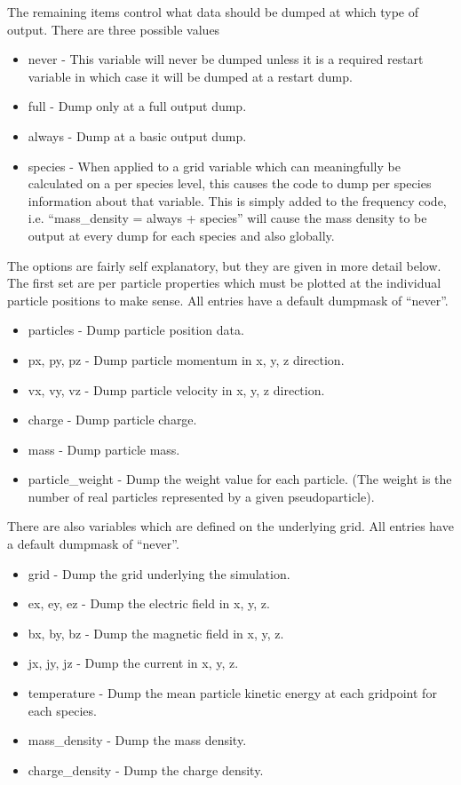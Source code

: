 The remaining items control what data should be dumped at which type of
output. There are three possible values\\
\begin{itemize}
\item never - This variable will never be dumped unless it is a required restart
  variable in which case it will be dumped at a restart dump.
\item full - Dump only at a full output dump.
\item always - Dump at a basic output dump.
\item species - When applied to a grid variable which can meaningfully be
  calculated on a per species level, this causes the code to dump per species
  information about that variable. This is simply added to the frequency code,
  i.e. ``mass\_density = always + species'' will cause the mass density to be
  output at every dump for each species and also globally.
\end{itemize}

The options are fairly self explanatory, but they are given in more detail
below. The first set are per particle properties which must be plotted at the
individual particle positions to make sense. All entries have a default
dumpmask of ``never''.\\
\begin{itemize}
\item particles - Dump particle position data.
\item px, py, pz - Dump particle momentum in x, y, z direction.
\item vx, vy, vz - Dump particle velocity in x, y, z direction.
\item charge - Dump particle charge.
\item mass - Dump particle mass.
\item particle\_weight - Dump the weight value for each particle. (The weight
  is the number of real particles represented by a given pseudoparticle).
\end{itemize}

There are also variables which are defined on the underlying grid. All entries
have a default dumpmask of ``never''.\\
\begin{itemize}
\item grid - Dump the grid underlying the simulation.
\item ex, ey, ez - Dump the electric field in x, y, z.
\item bx, by, bz - Dump the magnetic field in x, y, z.
\item jx, jy, jz - Dump the current in x, y, z.
\item temperature - Dump the mean particle kinetic energy at each gridpoint
  for each species.
\item mass\_density - Dump the mass density.
\item charge\_density - Dump the charge density.
\end{itemize}

